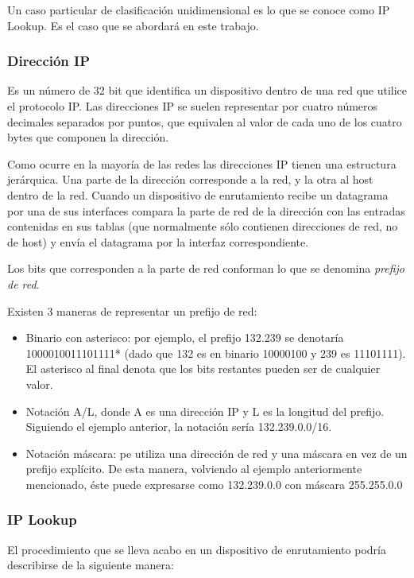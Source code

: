 Un caso particular de clasificación unidimensional es lo que se conoce como IP Lookup. Es el caso que se abordará en este trabajo.

\subsubsection{Dirección IP}

Es un número de 32 bit que identifica un dispositivo dentro de una red que utilice el protocolo IP. Las direcciones IP se suelen representar por cuatro números decimales separados por puntos, que equivalen al valor de cada uno de los cuatro bytes que componen la dirección.

Como ocurre en la mayoría de las redes las direcciones IP tienen una estructura jerárquica. Una parte de la dirección corresponde a la red, y la otra al host dentro de la red. Cuando un dispositivo de enrutamiento recibe un datagrama por una de sus interfaces compara la parte de red de la dirección con las entradas contenidas en sus tablas (que normalmente sólo contienen direcciones de red, no de host) y envía el datagrama por la interfaz correspondiente.

Los bits que corresponden a la parte de red conforman lo que se denomina \textit{prefijo de red}.

Existen 3 maneras de representar un prefijo de red:

\begin{itemize}
	\item Binario con asterisco: por ejemplo, el prefijo 132.239 se denotaría 1000010011101111* (dado que 132 es en binario 10000100 y 239 es 11101111). El asterisco al final denota que los bits restantes pueden ser de cualquier valor.
	\item Notación A/L, donde A es una dirección IP y L es la longitud del prefijo. Siguiendo el ejemplo anterior, la notación sería 132.239.0.0/16.
	\item Notación máscara: pe utiliza una dirección de red y una máscara en vez de un prefijo explícito. De esta manera, volviendo al ejemplo anteriormente mencionado, éste puede expresarse como 132.239.0.0 con máscara 255.255.0.0
\end{itemize}

\subsubsection{IP Lookup}

El procedimiento que se lleva acabo en un dispositivo de enrutamiento podría describirse de la siguiente manera:

